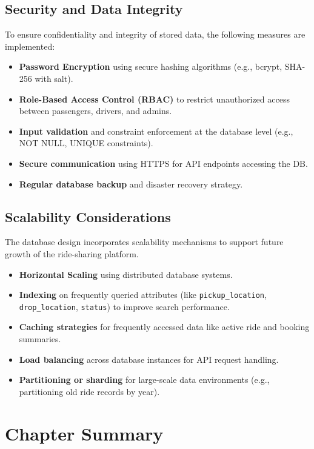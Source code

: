 \subsection{Security and Data Integrity}

To ensure confidentiality and integrity of stored data, the following measures are implemented:
\begin{itemize}
    \item \textbf{Password Encryption} using secure hashing algorithms (e.g., bcrypt, SHA-256 with salt).
    \item \textbf{Role-Based Access Control (RBAC)} to restrict unauthorized access between passengers, drivers, and admins.
    \item \textbf{Input validation} and constraint enforcement at the database level (e.g., NOT NULL, UNIQUE constraints).
    \item \textbf{Secure communication} using HTTPS for API endpoints accessing the DB.
    \item \textbf{Regular database backup} and disaster recovery strategy.
\end{itemize}

\subsection{Scalability Considerations}

The database design incorporates scalability mechanisms to support future growth of the ride-sharing platform.
\begin{itemize}
    \item \textbf{Horizontal Scaling} using distributed database systems.
    \item \textbf{Indexing} on frequently queried attributes (like \texttt{pickup\_location}, \texttt{drop\_location}, \texttt{status}) to improve search performance.
    \item \textbf{Caching strategies} for frequently accessed data like active ride and booking summaries.
    \item \textbf{Load balancing} across database instances for API request handling.
    \item \textbf{Partitioning or sharding} for large-scale data environments (e.g., partitioning old ride records by year).
\end{itemize}

\section{Chapter Summary}

